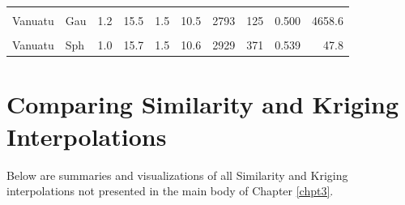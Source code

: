 \begin{ThreePartTable}
\begin{longtable}[t]{llrrrrrrrr}
\cellcolor{gray!6}{Vanuatu} & \cellcolor{gray!6}{Exp} & \cellcolor{gray!6}{1.0} & \cellcolor{gray!6}{15.0} & \cellcolor{gray!6}{1.6} & \cellcolor{gray!6}{10.1} & \cellcolor{gray!6}{3075} & \cellcolor{gray!6}{181} & \cellcolor{gray!6}{0.554} & \cellcolor{gray!6}{45.6}\\
Vanuatu & Gau & 1.2 & 15.5 & 1.5 & 10.5 & 2793 & 125 & 0.500 & 4658.6\\
\cellcolor{gray!6}{Vanuatu} & \cellcolor{gray!6}{Lin} & \cellcolor{gray!6}{1.4} & \cellcolor{gray!6}{15.3} & \cellcolor{gray!6}{1.6} & \cellcolor{gray!6}{10.1} & \cellcolor{gray!6}{3033} & \cellcolor{gray!6}{286} & \cellcolor{gray!6}{0.520} & \cellcolor{gray!6}{48.0}\\
Vanuatu & Sph & 1.0 & 15.7 & 1.5 & 10.6 & 2929 & 371 & 0.539 & 47.8\\*
\end{longtable}
\end{ThreePartTable}
\endgroup{}

\endgroup

\clearpage

\hypertarget{interpDiffAppendix}{%
\section{Comparing Similarity and Kriging Interpolations}\label{interpDiffAppendix}}

Below are summaries and visualizations of all Similarity and Kriging interpolations not presented in the main body of Chapter \ref{chpt3}.



